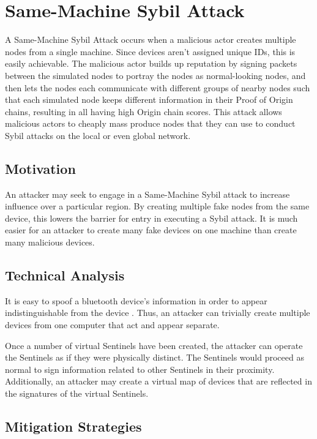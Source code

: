 \documentclass{article}
\begin{document}
\section{Same-Machine Sybil Attack}
A Same-Machine Sybil Attack occurs when a malicious actor creates multiple nodes from a single machine. Since devices aren't assigned unique IDs, this is easily achievable. The malicious actor builds up reputation by signing packets between the simulated nodes to portray the nodes as normal-looking nodes, and then lets the nodes each communicate with different groups of nearby nodes such that each simulated node keeps different information in their Proof of Origin chains, resulting in all having high Origin chain scores. This attack allows malicious actors to cheaply mass produce nodes that they can use to conduct Sybil attacks on the local or even global network. 

\subsection{Motivation}

An attacker may seek to engage in a Same-Machine Sybil attack to increase influence over a particular region. By creating multiple fake nodes from the same device, this lowers the barrier for entry in executing a Sybil attack. It is much easier for an attacker to create many fake devices on one machine than create many malicious devices.

\subsection{Technical Analysis}

It is easy to spoof a bluetooth device's information in order to appear indistinguishable from the device \cite{bluetooth3}. Thus, an attacker can trivially create multiple devices from one computer that act and appear separate.

Once a number of virtual Sentinels have been created, the attacker can operate the Sentinels as if they were physically distinct. The Sentinels would proceed as normal to sign information related to other Sentinels in their proximity. Additionally, an attacker may create a virtual map of devices that are reflected in the signatures of the virtual Sentinels.

\subsection{Mitigation Strategies}
\end{document}
